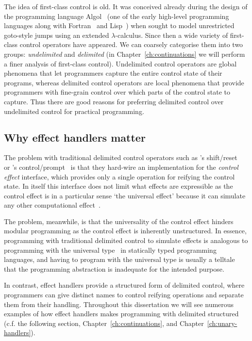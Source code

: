 \documentclass[12pt,phd,lfcs,twoside,openright,logo,leftchapter,normalheadings]{infthesis}
\theoremstyle{plain}
\theoremstyle{definition}
\begin{document}
The idea of first-class control is old. It was conceived already
during the design of the programming language
Algol~\cite{BackusBGKMPRSVWWW60} (one of the early high-level
programming languages along with Fortran~\cite{BackusBBGHHNSSS57} and
Lisp~\cite{McCarthy60}) when \citet{Landin98} sought to model
unrestricted goto-style jumps using an extended $\lambda$-calculus.
%
Since then a wide variety of first-class control operators have
appeared. We can coarsely categorise them into two groups:
\emph{undelimited} and \emph{delimited} (in
Chapter~\ref{ch:continuations} we will perform a finer analysis of
first-class control). Undelimited control operators are global
phenomena that let programmers capture the entire control state of
their programs, whereas delimited control operators are local
phenomena that provide programmers with fine-grain control over which
parts of the control state to capture.
%
Thus there are good reasons for preferring delimited control over
undelimited control for practical programming.

\subsection{Why effect handlers matter}
%
The problem with traditional delimited control operators such as
\citeauthor{DanvyF90}'s shift/reset~\cite{DanvyF90} or
\citeauthor{Felleisen88}'s control/prompt~\cite{Felleisen88} is that
they hard-wire an implementation for the \emph{control effect}
interface, which provides only a single operation for reifying the
control state. In itself this interface does not limit what effects
are expressible as the control effect is in a particular sense `the
universal effect' because it can simulate any other computational
effect~\cite{Filinski96}.

The problem, meanwhile, is that the universality of the control effect
hinders modular programming as the control effect is inherently
unstructured. In essence, programming with traditional delimited
control to simulate effects is analogous to programming with the
universal type~\cite{Longley03} in statically typed programming
languages, and having to program with the universal type is usually a
telltale that the programming abstraction is inadequate for the
intended purpose.

In contrast, effect handlers provide a structured form of delimited
control, where programmers can give distinct names to control reifying
operations and separate them from their handling. Throughout this
dissertation we will see numerous examples of how effect handlers
makes programming with delimited structured (c.f. the following
section, Chapter~\ref{ch:continuations}, and
Chapter~\ref{ch:unary-handlers}).
%
\end{document}
